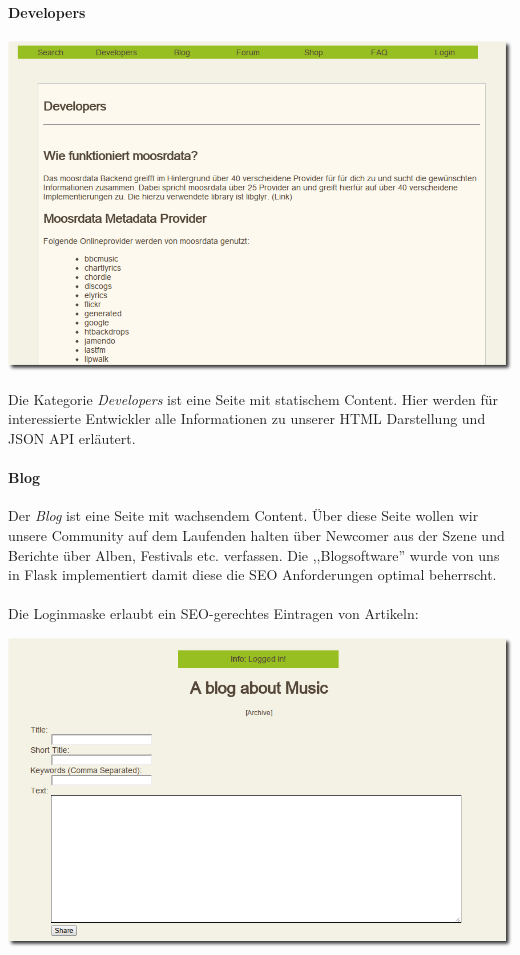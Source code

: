 \newpage
\paragraph{Developers}
\label{static_page}
\begin{center}
\includegraphics[width=\textwidth]{../screenshots/developers.png}
\end{center}

Die Kategorie \emph{Developers} ist eine Seite mit statischem Content. Hier
werden für interessierte Entwickler alle Informationen zu unserer HTML
Darstellung und JSON API erläutert.

\paragraph{Blog}
Der \emph{Blog} ist eine Seite mit wachsendem Content. Über diese Seite wollen
wir unsere Community auf dem Laufenden halten über Newcomer aus der Szene und
Berichte über Alben, Festivals etc. verfassen. Die ,,Blogsoftware'' wurde von
uns in Flask implementiert damit diese die SEO Anforderungen optimal beherrscht.
\\
\\
Die Loginmaske erlaubt ein SEO-gerechtes Eintragen von Artikeln:
\begin{center}
\includegraphics[width=\textwidth]{../screenshots/post_entry.png}
\end{center}
\label{blog_post_mask}

